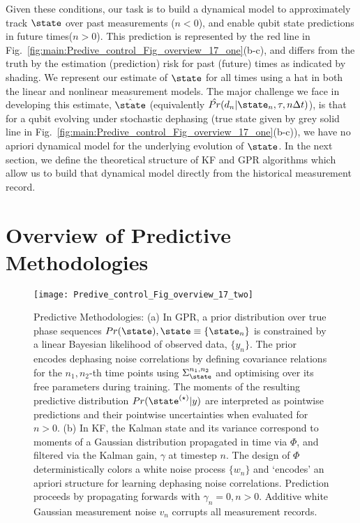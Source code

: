 Given these conditions, our task is to build a dynamical model to approximately track $\state$ over past measurements ($n<0$), and enable qubit state predictions in future times($n>0$).  This prediction is represented by the red line in Fig.~\ref{fig:main:Predive_control_Fig_overview_17_one}(b-c), and differs from the truth by the estimation (prediction) risk for past (future) times as indicated by shading.  We represent our estimate of $\state$ for all times using a hat in both the linear and nonlinear measurement models.  The major challenge we face in developing this estimate, $\hat{\state}$ (equivalently $\hat{Pr}(d_n | \state_n, \tau, n\Delta t)$), is that for a qubit evolving under stochastic dephasing (true state given by grey solid line in Fig.~\ref{fig:main:Predive_control_Fig_overview_17_one}(b-c)), we have no apriori dynamical model for the underlying evolution of $\state$.  In the next section, we define the theoretical structure of KF and GPR algorithms which allow us to build that dynamical model directly from the historical measurement record. 




\section{Overview of Predictive Methodologies \label{sec:main:OverviewofPredictive Methodologies}}
\begin{figure*}[ht]
    \texttt{[image: Predive\_control\_Fig\_overview\_17\_two]} 
    \caption{ \label{fig:main:Predive_control_Fig_overview_17_two} Predictive Methodologies: (a) In GPR, a prior  distribution over true phase sequences $Pr(\state), \state \equiv \{ \state_n \}$ is constrained by a linear Bayesian likelihood of observed data, $\{ y_n\}$. The prior encodes dephasing noise correlations by defining covariance relations for the $n_1, n_2$-th time points using  $\Sigma_\state^{n_1, n_2}$ and optimising over its free parameters during training. The moments of the resulting predictive distribution $Pr(\state^{(\star)}|y)$ are interpreted as pointwise predictions and their pointwise uncertainties when evaluated for $n>0$.  (b) In KF, the Kalman state and its variance correspond to moments of a Gaussian distribution propagated in time via $\Phi$, and filtered via the Kalman gain, $\gamma$ at timestep $n$. The design of $\Phi$ deterministically colors a white noise process $\{w_n \}$ and `encodes' an apriori structure for learning dephasing noise correlations. Prediction proceeds by propagating forwards with $\gamma_n=0, n>0$. Additive white Gaussian measurement noise $v_n$ corrupts all measurement records.}
\end{figure*}

